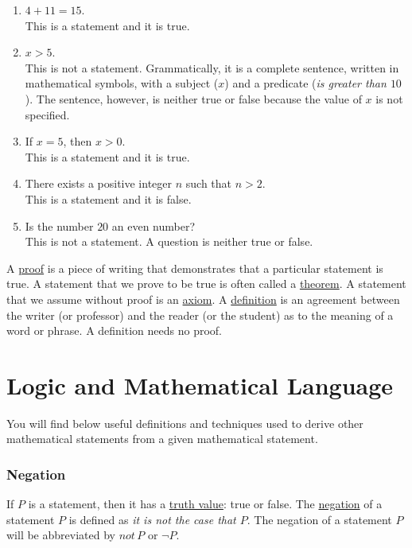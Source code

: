 \begin{example}
\begin{enumerate}[label=\alph*)]
\item $4 + 11 = 15$. \\This is a statement and it is true.
\item $x > 5$.\\ This is not a statement. Grammatically, it is a complete sentence, written in mathematical symbols, with a subject ($x$) and a predicate (\textit{is greater than $10$}). The sentence, however, is neither true or false because the value of $x$ is not specified.
\item If $x = 5$, then $x > 0$. \\This is a statement and it is true.
\item There exists a positive integer $n$ such that $n > 2$.\\ This is a statement and it is false.
\item Is the number $20$ an even number? \\This is not a statement. A question is neither true or false.
\end{enumerate}
\end{example}

A \underline{proof} is a piece of writing that demonstrates that a particular statement is true. A statement that we prove to be true is often called a \underline{theorem}. A statement that we assume without proof is an \underline{axiom}. A \underline{definition} is an agreement between the writer (or professor) and the reader (or the student) as to the meaning of a word or phrase. A definition needs no proof.



\section{Logic and Mathematical Language}
You will find below useful definitions and techniques used to derive other mathematical statements from a given mathematical statement.

\subsubsection*{Negation}
If $P$ is a statement, then it has a \underline{truth value}: true or false. The \underline{negation} of a statement $P$ is defined as \textit{it is not the case that $P$}. The negation of a statement $P$ will be abbreviated by $not\, P$ or $\neg P$.

